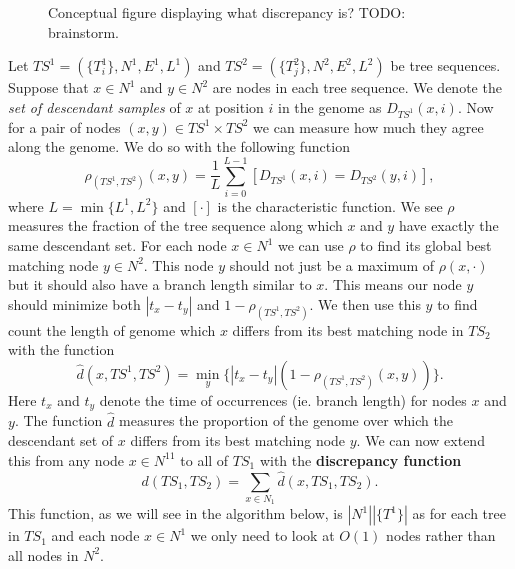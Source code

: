 \documentclass[10pt,twoside,lineno]{gsajnl}
\begin{document}
\begin{figure}

    \caption{
        Conceptual figure displaying what discrepancy is?
        TODO: brainstorm.
        \label{fig:conceptual_discrepancy}
    }
\end{figure}

 Let $TS^1=(\{T_i^1\},N^1,E^1,L^1)$ and $TS^2=(\{T^2_j\},N^2,E^2,L^2)$ be tree sequences.
 Suppose that $x\in N^1$ and $y\in N^2$ are nodes in each tree sequence.
 We denote the \textit{set of descendant samples} of $x$ at position $i$ in the genome as $D_{TS^1}(x,i)$.
 Now for a pair of nodes $(x,y)\in TS^1\times TS^2$ 
 we can measure how much they agree along the genome.
 We do so with the following function
 $$\rho_{(TS^1,TS^2)}(x,y)=\frac{1}{L}\sum_{i=0}^{L-1}[D_{TS^1}(x,i)=D_{TS^2}(y,i)],$$
 where $L=\min\{L^1,L^2\}$ and $[\cdot]$ is the characteristic function. 
 We see $\rho$ measures the fraction of the tree sequence
 along which $x$ and $y$ have exactly the same descendant set. 
 For each node $x\in N^1$ we can use $\rho$ to find its global best matching node $y\in N^2$. 
 This node $y$ should not just be a maximum of $\rho(x,\cdot)$ but it should also have a branch length similar to $x$. 
 This means our node $y$ should minimize both $|t_x-t_y|$ and $1-\rho_{(TS^1,TS^2)}$.
 We then use this $y$ to find count the length of genome which $x$ differs from its best matching node in $TS_2$ with the function
 $$\hat{d}(x,TS^1,TS^2)=\min_y\{|t_x-t_y|(1-\rho_{(TS^1,TS^2)}(x,y))\}.$$
 Here $t_x$ and $t_y$ denote the time of occurrences (ie. branch length) for nodes $x$ and $y$. 
 The function $\hat{d}$ measures the proportion of the genome 
 over which the descendant set of $x$ differs from its best matching node $y$.
 We can now extend this from any node $x\in N^11$ to all of $TS_1$ with the \textbf{discrepancy function}
 $$d(TS_1,TS_2)=\sum_{x\in N_1}\hat{d}(x,TS_1,TS_2).$$
 This function, as we will see in the algorithm below,
 is $|N^1||\{T^1\}|$ as for each tree in $TS_1$ and each node $x\in N^1$ we only need to look at $O(1)$ nodes rather than all nodes in $N^2$.
 
\end{document}
